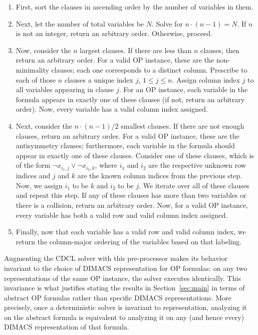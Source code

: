 \documentclass[10pt,a4paper]{article}
\begin{document}
\begin{enumerate}
    \item First, sort the clauses in ascending order by the number of variables in them. 
    \item Next, let the number of total variables be $N$. Solve for $n \cdot (n - 1) = N$. If $n$ is not an integer, return an arbitrary order. Otherwise, proceed. 
    \item Now, consider the $n$ largest clauses. If there are less than $n$ clauses, then return an arbitrary order. For a valid OP instance, these are the non-minimality clauses; each one corresponds to a distinct column. Prescribe to each of those $n$ clauses a unique index $j$, $1 \leq j \leq n$. Assign column index $j$ to all variables appearing in clause $j$. For an OP instance, each variable in the formula appears in exactly one of these clauses (if not, return an arbitrary order). Now, every variable has a valid column index assigned. 
    \item Next, consider the $n \cdot (n - 1) / 2$ smallest clauses. If there are not enough clauses, return an arbitrary order. For a valid OP instance, these are the antisymmetry clauses; furthermore, each variable in the formula should appear in exactly one of these clauses. Consider one of these clauses, which is of the form $\neg x_{i_1, j} \lor \neg x_{i_2, k}$, where $i_1$ and $i_2$ are the respective unknown row indices and $j$ and $k$ are the known column indices from the previous step. Now, we assign $i_1$ to be $k$ and $i_2$ to be $j$. We iterate over all of these clauses and repeat this step. If any of these clauses has more than two variables or there is a collision, return an arbitrary order. Now, for a valid OP instance, every variable has both a valid row and valid column index assigned. 
    \item Finally, now that each variable has a valid row and valid column index, we return the column-major ordering of the variables based on that labeling.
\end{enumerate}

Augmenting the CDCL solver with this pre-processor makes its behavior invariant to the choice of DIMACS representation for OP formulas: on any two representations of the same OP instance, the solver executes identically. This invariance is what justifies stating the results in Section~\ref{sec:main} in terms of abstract OP formulas rather than specific DIMACS representations. More precisely, once a deterministic solver is invariant to representation, analyzing it on the abstract formula is equivalent to analyzing it on any (and hence every) DIMACS representation of that formula.
\end{document}
